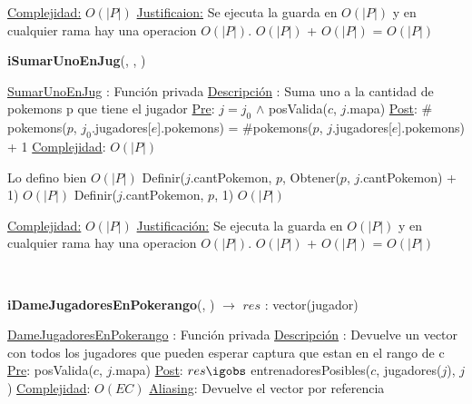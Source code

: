 \begin{Algoritmos}
\begin{algorithm}[H]
\begin{algorithmic}[1]
\medskip
\Statex \underline{Complejidad:} $O(|P|)$
\Statex \underline{Justificaion:} Se ejecuta la guarda en $O(|P|)$ y en cualquier rama hay una operacion $O(|P|)$. $O(|P|)$ + $O(|P|)$ = $O(|P|)$

\end{algorithmic}
\end{algorithm}  
  




\begin{algorithm}[H]
{\textbf{iSumarUnoEnJug}(, , )}
\begin{algorithmic}[1]


\Statex \underline{SumarUnoEnJug} : Funci\'on privada 
\Statex \underline{Descripci\'on} : Suma uno a la cantidad de pokemons p que tiene el jugador 
\Statex \underline{Pre}: $j = j_0$ $\land$  posValida($c$, $j$.mapa)
\Statex \underline{Post}: $\#$pokemons($p$, $j_0$.jugadores[$e$].pokemons) = $\#$pokemons($p$, $j$.jugadores[$e$].pokemons) + 1
\Statex \underline{Complejidad}: $O(|P|)$ 

 Lo defino bien
 \Comment $O(|P|)$
  \State Definir($j$.cantPokemon, $p$, Obtener($p$, $j$.cantPokemon) + 1) \Comment $O(|P|)$
\Else
  \State Definir($j$.cantPokemon, $p$, 1)  \Comment $O(|P|)$
\EndIf


\medskip
\Statex \underline{Complejidad:} $O(|P|)$
\Statex \underline{Justificaci\'on:} Se ejecuta la guarda en $O(|P|)$ y en cualquier rama hay una operacion $O(|P|)$. $O(|P|)$ + $O(|P|)$ = $O(|P|)$

\end{algorithmic}
\end{algorithm}  


$ $\newline
$ $\newline
$ $\newline



{\textbf{iDameJugadoresEnPokerango}(, ) $\to$ $res$ : vector(jugador)}
\begin{algorithmic}[1]

\Statex \underline{DameJugadoresEnPokerango} : Funci\'on privada 
\Statex \underline{Descripci\'on} : Devuelve un vector con todos los jugadores que pueden esperar captura que estan en el rango de c 
\Statex \underline{Pre}: posValida($c$, $j$.mapa)
\Statex \underline{Post}: $res \igobs$ entrenadoresPosibles($c$, jugadores($j$), $j$)
\Statex \underline{Complejidad}: $O(EC)$ 
\Statex \underline{Aliasing}: Devuelve el vector por referencia 


\end{algorithmic}
\end{Algoritmos}
